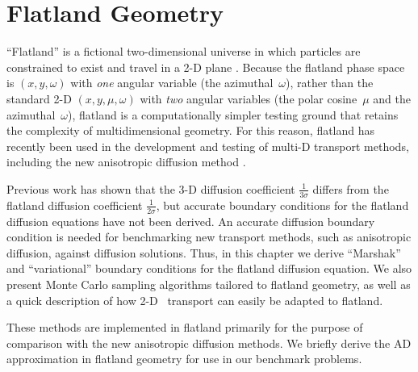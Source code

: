 
\chapter{Flatland Geometry}\label{chap:flatland}

``Flatland'' is a fictional two-dimensional universe in which particles are
constrained to exist and
travel in a 2-D plane \cite{Asa2008}. Because the flatland phase space is
$(x,y,\omega)$ with \emph{one} angular variable (the azimuthal~$\omega$),
rather than the
standard 2-D $(x,y,\mu,\omega)$ with \emph{two} angular variables (the
polar cosine~$\mu$ and the azimuthal~$\omega$),
flatland is a computationally simpler testing ground that retains the
complexity of multidimensional geometry. For this reason, flatland has recently
been used in the development and testing of multi-D transport methods, including
the new anisotropic diffusion method \cite{Lar2009c,Joh2011,Tra2011}.

Previous work has shown that the 3-D diffusion coefficient
$\frac{1}{3\sigma}$ differs from the flatland diffusion coefficient
$\frac{1}{2\sigma}$, but accurate boundary conditions for the flatland
diffusion equations have not been derived. An accurate diffusion
boundary condition is needed for benchmarking new transport methods, such as
anisotropic diffusion, against
diffusion solutions. Thus, in this chapter we derive ``Marshak''
and ``variational'' boundary conditions for the flatland diffusion equation.
We also present Monte Carlo sampling algorithms tailored to flatland
geometry, as well as a quick description of how 2-D \SN\ transport can easily be
adapted to flatland.

These methods are implemented in flatland primarily for the purpose of
comparison with the new anisotropic diffusion methods. We briefly derive the
AD approximation in flatland geometry for use in our benchmark problems.

%

